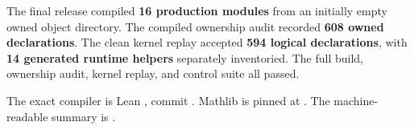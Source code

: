 The final release compiled \textbf{16 production modules} from an initially empty owned object directory. The compiled ownership audit recorded \textbf{608 owned declarations}. The clean kernel replay accepted \textbf{594 logical declarations}, with \textbf{14 generated runtime helpers} separately inventoried. The full build, ownership audit, kernel replay, and control suite all passed.

The exact compiler is Lean , commit . Mathlib is pinned at . The machine-readable summary is .
